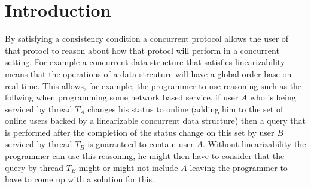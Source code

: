% 
% 
% 
% 
% 
% 
% 
% 
% 

\section{Introduction}

By satisfying a consistency condition a concurrent protocol allows the
user of that protocl to reason about how that protocl will perform in
a concurrent setting.
For example a concurrent data structure that satisfies linearizability
means that the operations of a data strcuture will have a global order
base on real time.
This allows, for example, the programmer to use reasoning such as the follwing
when programming some network based service, if user $A$ who
is being serviced by thread $T_A$ changes his status to online (adding him
to the set of online users backed by a linearizable concurrent data structure)
then a query that is performed after the completion of the status change
on this set by user $B$ serviced by thread $T_B$ is guaranteed to contain
user $A$.
Without linearizability the programmer can use this reasoning, he might then
have to consider that the query by thread $T_B$ might or might not include $A$
leaving the programmer to have to come up with a solution for this.

